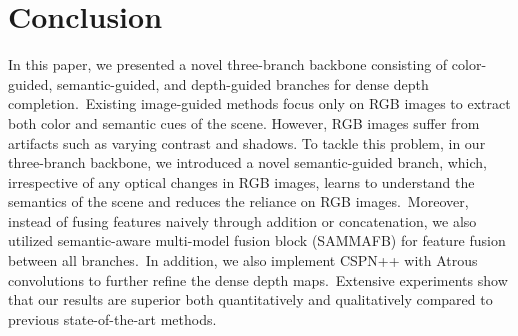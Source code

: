 \documentclass{ieeeaccess}
\begin{document}
\section{Conclusion}
In this paper, we presented a novel three-branch backbone consisting of color-guided, semantic-guided, and depth-guided branches for dense depth completion.~Existing image-guided methods focus only on RGB images to extract both color and semantic cues of the scene. However, RGB images suffer from artifacts such as varying contrast and shadows. To tackle this problem, in our three-branch backbone, we introduced a novel semantic-guided branch, which, irrespective of any optical changes in RGB images, learns to understand the semantics of the scene and reduces the reliance on RGB images.~Moreover, instead of fusing features naively through addition or concatenation, we also utilized semantic-aware multi-model fusion block (SAMMAFB) for feature fusion between all branches.~In addition, we also implement CSPN++ with Atrous convolutions to further refine the dense depth maps.~Extensive experiments show that our results are superior both quantitatively and qualitatively compared to previous state-of-the-art methods.


{\small


}


\EOD
\end{document}
